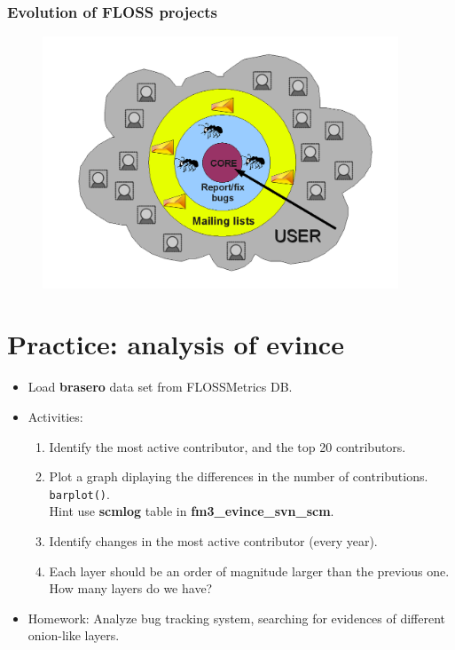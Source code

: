 \documentclass{beamer}
\begin{document}
\begin{frame}
\frametitle{Evolution of FLOSS projects}
\begin{center}
\begin{figure}
 \includegraphics[height=7.5cm]{figs/progression.png}
\end{figure}
\end{center}
\end{frame}

\section{Practice: analysis of \bfseries{evince}}

\begin{frame}
 \begin{itemize}
  \item Load \textbf{brasero} data set from FLOSSMetrics DB.
  \item Activities:
  \begin{enumerate}
   \item Identify the most active contributor, and the top 20 contributors.
   \item Plot a graph diplaying the differences in the number of contributions.
   \texttt{barplot()}.\\Hint use \textbf{scmlog} table in \textbf{fm3\_evince\_svn\_scm}.
   \item Identify changes in the most active contributor (every year).\\
   \item Each layer should be an order of magnitude larger than the
   previous one. How many layers do we have?
  \end{enumerate}
  \item Homework: Analyze bug tracking system, searching for evidences
  of different onion-like layers.
 \end{itemize}
\end{frame}
\end{document}
